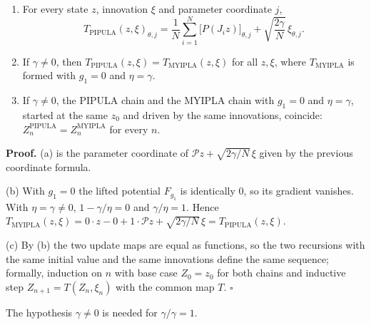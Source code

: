 \documentclass[11pt,a4paper]{report}
\begin{document}
\begin{enumerate}


\item For every state \(z\), innovation \(\xi\) and parameter coordinate \(j\),
\[T_{\mathrm{PIPULA}}(z,\xi)_{\theta,j}=\frac1N\sum_{i=1}^N\bigl[P(J_iz)\bigr]_{\theta,j}+\sqrt{\frac{2\gamma}N}\,\xi_{\theta,j}.\]

\item If \(\gamma\ne0\), then \(T_{\mathrm{PIPULA}}(z,\xi)=T_{\mathrm{MYIPLA}}(z,\xi)\) for all \(z,\xi\), where \(T_{\mathrm{MYIPLA}}\) is formed with \(g_1=0\) and \(\eta=\gamma\).

\item If \(\gamma\ne0\), the PIPULA chain and the MYIPLA chain with \(g_1=0\) and \(\eta=\gamma\), started at the same \(z_0\) and driven by the same innovations, coincide: \(Z_n^{\mathrm{PIPULA}}=Z_n^{\mathrm{MYIPLA}}\) for every \(n\).

\end{enumerate}



\textbf{Proof.} (a) is the parameter coordinate of \(\mathcal Pz+\sqrt{2\gamma/N}\,\xi\) given by the previous coordinate formula.




(b) With \(g_1=0\) the lifted potential \(F_{g_1}\) is identically \(0\), so its gradient vanishes. With \(\eta=\gamma\ne0\), \(1-\gamma/\eta=0\) and \(\gamma/\eta=1\). Hence \(T_{\mathrm{MYIPLA}}(z,\xi)=0\cdot z-0+1\cdot\mathcal Pz+\sqrt{2\gamma/N}\,\xi=T_{\mathrm{PIPULA}}(z,\xi)\).




(c) By (b) the two update maps are equal as functions, so the two recursions with the same initial value and the same innovations define the same sequence; formally, induction on \(n\) with base case \(Z_0=z_0\) for both chains and inductive step \(Z_{n+1}=T(Z_n,\xi_n)\) with the common map \(T\). \(\square\)




The hypothesis \(\gamma\ne0\) is needed for \(\gamma/\gamma=1\).
\end{document}
